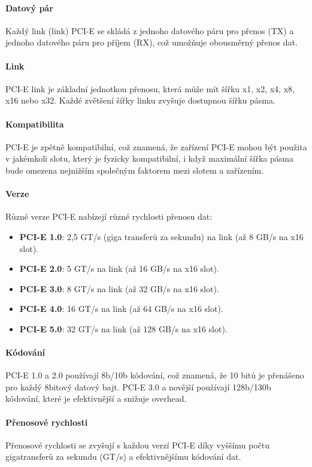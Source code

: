\paragraph{Datový pár}
Každý link (link) PCI-E se skládá z jednoho datového páru pro přenos (TX) a jednoho datového páru pro příjem (RX), což umožňuje obousměrný přenos dat.

\paragraph{Link}
PCI-E link je základní jednotkou přenosu, která může mít šířku x1, x2, x4, x8, x16 nebo x32. Každé zvětšení šířky linku zvyšuje dostupnou šířku pásma.

\paragraph{Kompatibilita}
PCI-E je zpětně kompatibilní, což znamená, že zařízení PCI-E mohou být použita v jakémkoli slotu, který je fyzicky kompatibilní, i když maximální šířka pásma bude omezena nejnižším společným faktorem mezi slotem a zařízením.

\paragraph{Verze}
Různé verze PCI-E nabízejí různé rychlosti přenosu dat:
\begin{itemize}
\item \textbf{PCI-E 1.0}: 2,5 GT/s (giga transferů za sekundu) na link (až 8 GB/s na x16 slot).
\item \textbf{PCI-E 2.0}: 5 GT/s na link (až 16 GB/s na x16 slot).
\item \textbf{PCI-E 3.0}: 8 GT/s na link (až 32 GB/s na x16 slot).
\item \textbf{PCI-E 4.0}: 16 GT/s na link (až 64 GB/s na x16 slot).
\item \textbf{PCI-E 5.0}: 32 GT/s na link (až 128 GB/s na x16 slot).
\end{itemize}

\paragraph{Kódování}
PCI-E 1.0 a 2.0 používají 8b/10b kódování, což znamená, že 10 bitů je přenášeno pro každý 8bitový datový bajt. PCI-E 3.0 a novější používají 128b/130b kódování, které je efektivnější a snižuje overhead.

\paragraph{Přenosové rychlosti}
Přenosové rychlosti se zvyšují s každou verzí PCI-E díky vyššímu počtu gigatransferů za sekundu (GT/s) a efektivnějšímu kódování dat.


